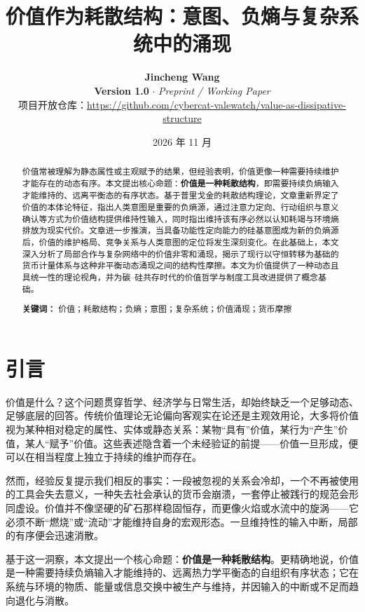 \documentclass[11pt,a4paper]{ctexart}
\title{\LARGE \textbf{价值作为耗散结构：意图、负熵与复杂系统中的涌现}}
\author{
    \textbf{Jincheng Wang}\\[0.3em]
    \small \textbf{Version 1.0} \quad $\cdot$ \quad \textit{Preprint / Working Paper}\\[0.2em]
    \small 项目开放仓库：\href{https://github.com/cybercat-valewatch/value-as-dissipative-structure}{https://github.com/cybercat-valewatch/value-as-dissipative-structure}
}
\date{2026 年 11 月}
\begin{document}
\maketitle

\begin{abstract}
价值常被理解为静态属性或主观赋予的结果，但经验表明，价值更像一种需要持续维护才能存在的动态有序。本文提出核心命题：\textbf{价值是一种耗散结构}，即需要持续负熵输入才能维持的、远离平衡态的有序状态。基于普里戈金的耗散结构理论，文章重新界定了价值的本体论特征，指出人类意图是重要的负熵源，通过注意力定向、行动组织与意义确认等方式为价值结构提供维持性输入，同时指出维持该有序必然以认知耗竭与环境熵排放为现实代价。文章进一步推演，当具备功能性定向能力的硅基意图成为新的负熵源后，价值的维护格局、竞争关系与人类意图的定位将发生深刻变化。在此基础上，本文深入分析了局部合作与复杂网络中的价值非零和涌现，揭示了现行以守恒转移为基础的货币计量体系与这种非平衡动态涌现之间的结构性摩擦。本文为价值提供了一种动态且具统一性的理论视角，并为碳--硅共存时代的价值哲学与制度工具改进提供了概念基础。

\vspace{0.8em}
\noindent \textbf{关键词：} 价值；耗散结构；负熵；意图；复杂系统；价值涌现；货币摩擦
\end{abstract}

\vspace{1.2em}

\section{引言}

价值是什么？这个问题贯穿哲学、经济学与日常生活，却始终缺乏一个足够动态、足够底层的回答。传统价值理论无论偏向客观实在论还是主观效用论，大多将价值视为某种相对稳定的属性、实体或静态关系：某物“具有”价值，某行为“产生”价值，某人“赋予”价值。这些表述隐含着一个未经验证的前提——价值一旦形成，便可以在相当程度上独立于持续的维护而存在。

然而，经验反复提示我们相反的事实：一段被忽视的关系会冷却，一个不再被使用的工具会失去意义，一种失去社会承认的货币会崩溃，一套停止被践行的规范会形同虚设。价值并不像坚硬的矿石那样稳固恒存，而更像火焰或水流中的旋涡——它必须不断“燃烧”或“流动”才能维持自身的宏观形态。一旦维持性的输入中断，局部的有序便会迅速消散。

基于这一洞察，本文提出一个核心命题：\textbf{价值是一种耗散结构}。更精确地说，价值是一种需要持续负熵输入才能维持的、远离热力学平衡态的自组织有序状态；它在系统与环境的物质、能量或信息交换中被生产与维持，并因输入的中断或不足而趋向退化与消散。
\end{document}
